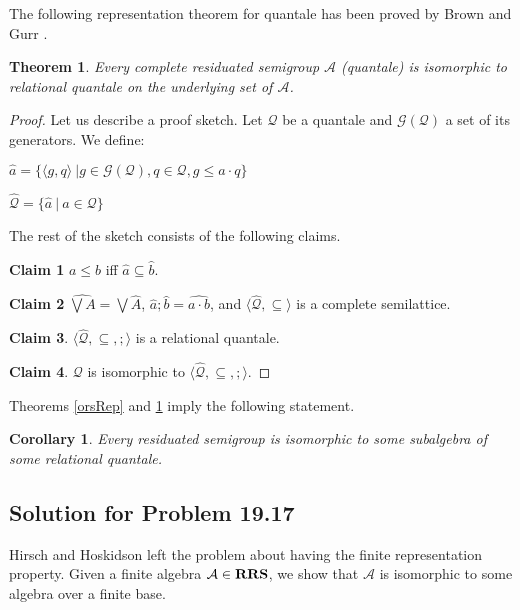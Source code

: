 \documentclass[a4paper]{article}
\theoremstyle{defin}
\theoremstyle{theorem}
\newtheorem{theorem}{Theorem}
\theoremstyle{prop}
\theoremstyle{lemma}
\theoremstyle{ex}
\theoremstyle{col}
\newtheorem{col}{Corollary}
\theoremstyle{claim}
\begin{document}
The following representation theorem for quantale has been proved by Brown and Gurr \cite{brown1993representation}.
\begin{theorem} \label{quantaleRep}
  Every complete residuated semigroup $\mathcal{A}$ (quantale) is isomorphic to relational quantale on the underlying set of $\mathcal{A}$.
\end{theorem}

\begin{proof}
  Let us describe a proof sketch. Let $\mathcal{Q}$ be a quantale and $\mathcal{G}(\mathcal{Q})$ a set of its generators. We define:

  \begin{center}
    $\hat{a} = \{ \langle g, q \rangle \: | g \in \mathcal{G}(\mathcal{Q}), q \in \mathcal{Q}, g \leq a \cdot q \}$

    $\widehat{\mathcal{Q}} = \{ \hat{a} \: | \: a \in \mathcal{Q} \}$
  \end{center}

  The rest of the sketch consists of the following claims.

  {\bf Claim 1} $a \leq b$ iff $\hat{a} \subseteq \hat{b}$.

  {\bf Claim 2} $\widehat{\bigvee A} = \bigvee \widehat{A}$, $\hat{a} ; \hat{b} = \widehat{a \cdot b}$, and $\langle \widehat{\mathcal{Q}}, \subseteq \rangle$ is a complete semilattice.

  {\bf Claim 3}. $\langle \widehat{\mathcal{Q}}, \subseteq, ; \rangle$ is a relational quantale.

  {\bf Claim 4}. $\mathcal{Q}$ is isomorphic to $\langle \widehat{\mathcal{Q}}, \subseteq, ; \rangle$.
\end{proof}

Theorems \ref{orsRep} and \ref{quantaleRep} imply the following statement.
\begin{col} \label{orsRep2}
  Every residuated semigroup is isomorphic to some subalgebra of some relational quantale.
\end{col}

\subsection{Solution for Problem 19.17 \cite{hirsch2002relation}}

Hirsch and Hoskidson left the problem about having the finite representation property. Given a finite algebra $\mathcal{A} \in {\bf RRS}$, we show that $\mathcal{A}$ is isomorphic to some algebra over a finite base.
\end{document}
